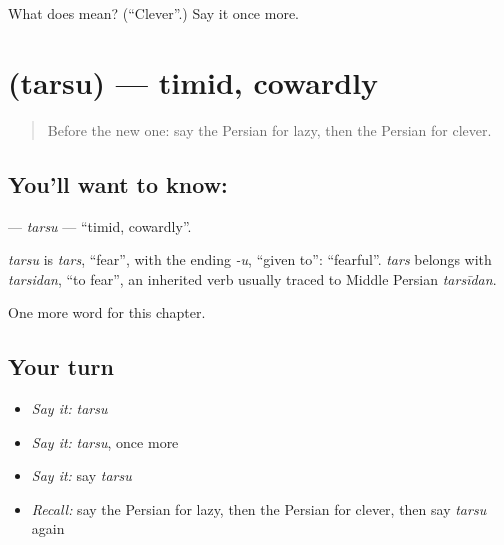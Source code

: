 \begin{tcolorbox}[breakable,colback=teal!4,colframe=teal!35!black,title={Before you move on}]
What does  mean? (\textquotedblleft{}Clever\textquotedblright{}.) Say it once more.
\end{tcolorbox}
\section[\texorpdfstring{\fa{ترسو} (tarsu)}{ترسو (tarsu)}]{ (tarsu) — timid, cowardly}

\label{lesson:FA-C126-tarsu}



\begin{quote}
Before the new one: say the Persian for lazy, then the Persian for clever.
\end{quote}

\subsection*{You'll want to know: }
\textbf{} — \emph{tarsu} — \textquotedblleft{}timid, cowardly\textquotedblright{}.

\begin{cousinweb}
\emph{tarsu} is \emph{tars}, \textquotedblleft{}fear\textquotedblright{}, with the ending \emph{-u}, \textquotedblleft{}given to\textquotedblright{}: \textquotedblleft{}fearful\textquotedblright{}. \emph{tars} belongs with \emph{tarsidan}, \textquotedblleft{}to fear\textquotedblright{}, an inherited verb usually traced to Middle Persian \emph{tarsīdan}.
\end{cousinweb}

\begin{grammarlens}[title={What you've built}]
One more word for this chapter.
\end{grammarlens}

\subsection*{Your turn}
\begin{itemize}
\raggedright
  \item \emph{Say it:} \emph{tarsu}
  \item \emph{Say it:} \emph{tarsu}, once more
  \item \emph{Say it:} say \emph{tarsu}
  \item \emph{Recall:} say the Persian for lazy, then the Persian for clever, then say \emph{tarsu} again
\end{itemize}

